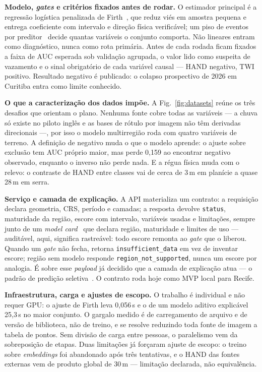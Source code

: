 \documentclass[conference]{IEEEtran}
\begin{document}
\textbf{Modelo, \emph{gates} e critérios fixados antes de rodar.} O estimador
principal é a regressão logística penalizada de Firth~\cite{firth1993}, que reduz
viés em amostra pequena e entrega coeficiente com intervalo e direção física
verificável; um piso de eventos por preditor~\cite{peduzzi1996} decide quantas
variáveis o conjunto comporta. Não lineares entram como diagnóstico, nunca como
rota primária. Antes de cada rodada ficam fixados a faixa de AUC esperada sob
validação agrupada, o valor lido como suspeita de vazamento e o sinal obrigatório
de cada variável causal --- HAND negativo, TWI positivo. Resultado negativo é
publicado: o colapso prospectivo de 2026 em Curitiba entra como limite
conhecido.

\textbf{O que a caracterização dos dados impõe.} A Fig.~\ref{fig:datasets} reúne
os três desafios que orientam o plano. Nenhuma fonte cobre todas as variáveis ---
a chuva só existe no piloto inglês e as bases de rótulo por imagem não têm
derivadas direcionais ---, por isso o modelo multirregião roda com quatro
variáveis de terreno. A definição de negativo muda o que o modelo aprende: o
ajuste sobre exclusão tem AUC próprio maior, mas perde 0,159 ao encontrar
negativo observado, enquanto o inverso não perde nada. E a régua física muda com
o relevo: o contraste de HAND entre classes vai de cerca de 3\,m em planície a
quase 28\,m em serra.

\textbf{Serviço e camada de explicação.} A API materializa um contrato: a
requisição declara geometria, CRS, período e camadas; a resposta devolve
\texttt{status}, maturidade da região, escore com intervalo, variáveis usadas e
limitações, sempre junto de um \emph{model card}~\cite{mitchell2019} que declara
região, maturidade e limites de uso --- auditável, aqui, significa rastreável:
todo escore remonta ao \emph{gate} que o liberou. Quando um \emph{gate} não
fecha, retorna \texttt{insufficient\_data} em vez de inventar escore; região sem
modelo responde \texttt{region\_not\_supported}, nunca um escore por analogia. É
sobre esse \emph{payload} já decidido que a camada de explicação atua --- o
padrão de predição seletiva~\cite{mitchell2019}. O contrato roda hoje como MVP
local para Recife.

\textbf{Infraestrutura, carga e ajustes de escopo.} O trabalho é individual e não
requer GPU: o ajuste de Firth leva 0,056\,s e o de um modelo aditivo explicável
25,3\,s no maior conjunto. O gargalo medido é de carregamento de arquivo e de
versão de biblioteca, não de treino, e se resolve reduzindo toda fonte de imagem
a tabela de pontos. Sem divisão de carga entre pessoas, o paralelismo vem da
sobreposição de etapas. Duas limitações já forçaram ajuste de escopo: o treino
sobre \emph{embeddings} foi abandonado após três tentativas, e o HAND das fontes
externas vem de produto global de 30\,m --- limitação declarada, não
equivalência.
\end{document}
